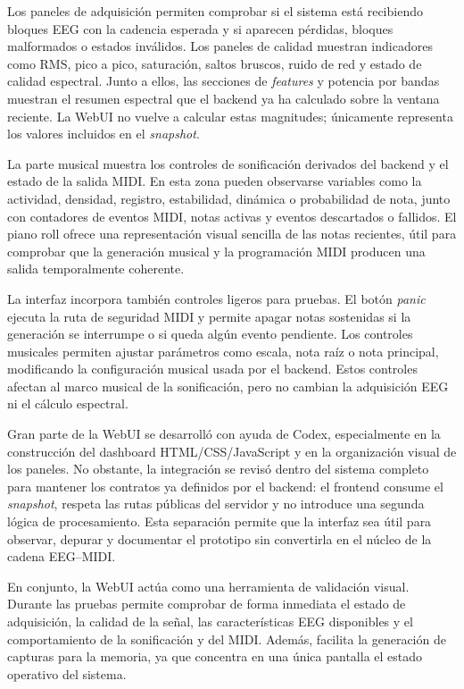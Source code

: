 \documentclass[../main.tex]{subfiles}
\begin{document}
Los paneles de adquisición permiten comprobar si el sistema está recibiendo bloques EEG con la cadencia esperada y si aparecen pérdidas, bloques malformados o estados inválidos. Los paneles de calidad muestran indicadores como RMS, pico a pico, saturación, saltos bruscos, ruido de red y estado de calidad espectral. Junto a ellos, las secciones de \textit{features} y potencia por bandas muestran el resumen espectral que el backend ya ha calculado sobre la ventana reciente. La WebUI no vuelve a calcular estas magnitudes; únicamente representa los valores incluidos en el \textit{snapshot}.

La parte musical muestra los controles de sonificación derivados del backend y el estado de la salida MIDI. En esta zona pueden observarse variables como la actividad, densidad, registro, estabilidad, dinámica o probabilidad de nota, junto con contadores de eventos MIDI, notas activas y eventos descartados o fallidos. El piano roll ofrece una representación visual sencilla de las notas recientes, útil para comprobar que la generación musical y la programación MIDI producen una salida temporalmente coherente.

La interfaz incorpora también controles ligeros para pruebas. El botón \textit{panic} ejecuta la ruta de seguridad MIDI y permite apagar notas sostenidas si la generación se interrumpe o si queda algún evento pendiente. Los controles musicales permiten ajustar parámetros como escala, nota raíz o nota principal, modificando la configuración musical usada por el backend. Estos controles afectan al marco musical de la sonificación, pero no cambian la adquisición EEG ni el cálculo espectral.

Gran parte de la WebUI se desarrolló con ayuda de Codex, especialmente en la construcción del dashboard HTML/CSS/JavaScript y en la organización visual de los paneles. No obstante, la integración se revisó dentro del sistema completo para mantener los contratos ya definidos por el backend: el frontend consume el \textit{snapshot}, respeta las rutas públicas del servidor y no introduce una segunda lógica de procesamiento. Esta separación permite que la interfaz sea útil para observar, depurar y documentar el prototipo sin convertirla en el núcleo de la cadena EEG--MIDI.

En conjunto, la WebUI actúa como una herramienta de validación visual. Durante las pruebas permite comprobar de forma inmediata el estado de adquisición, la calidad de la señal, las características EEG disponibles y el comportamiento de la sonificación y del MIDI. Además, facilita la generación de capturas para la memoria, ya que concentra en una única pantalla el estado operativo del sistema.

\end{document}
